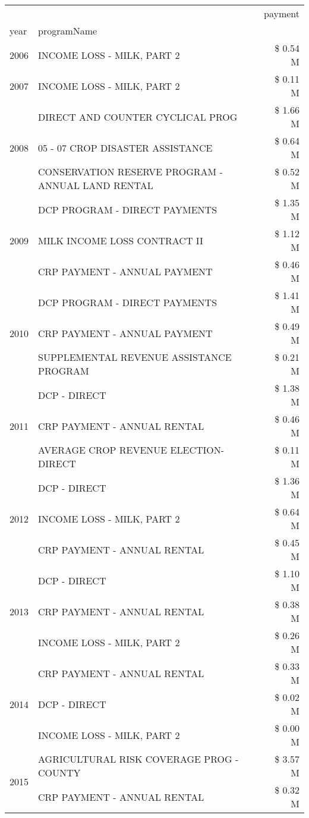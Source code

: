 \begin{tabular}{llr}
\toprule
 &  & payment \\
year & programName &  \\
\midrule
2006 & INCOME LOSS - MILK, PART 2 & \$ 0.54 M \\
\cline{1-3}
2007 & INCOME LOSS - MILK, PART 2 & \$ 0.11 M \\
\cline{1-3}
\multirow[t]{3}{*}{2008} & DIRECT AND COUNTER CYCLICAL PROG & \$ 1.66 M \\
 & 05 - 07 CROP DISASTER ASSISTANCE & \$ 0.64 M \\
 & CONSERVATION RESERVE PROGRAM - ANNUAL LAND RENTAL & \$ 0.52 M \\
\cline{1-3}
\multirow[t]{3}{*}{2009} & DCP PROGRAM - DIRECT PAYMENTS & \$ 1.35 M \\
 & MILK INCOME LOSS CONTRACT II & \$ 1.12 M \\
 & CRP PAYMENT - ANNUAL PAYMENT & \$ 0.46 M \\
\cline{1-3}
\multirow[t]{3}{*}{2010} & DCP PROGRAM - DIRECT PAYMENTS & \$ 1.41 M \\
 & CRP PAYMENT - ANNUAL PAYMENT & \$ 0.49 M \\
 & SUPPLEMENTAL REVENUE ASSISTANCE PROGRAM & \$ 0.21 M \\
\cline{1-3}
\multirow[t]{3}{*}{2011} & DCP - DIRECT & \$ 1.38 M \\
 & CRP PAYMENT - ANNUAL RENTAL & \$ 0.46 M \\
 & AVERAGE CROP REVENUE ELECTION-DIRECT & \$ 0.11 M \\
\cline{1-3}
\multirow[t]{3}{*}{2012} & DCP - DIRECT & \$ 1.36 M \\
 & INCOME LOSS - MILK, PART 2 & \$ 0.64 M \\
 & CRP PAYMENT - ANNUAL RENTAL & \$ 0.45 M \\
\cline{1-3}
\multirow[t]{3}{*}{2013} & DCP - DIRECT & \$ 1.10 M \\
 & CRP PAYMENT - ANNUAL RENTAL & \$ 0.38 M \\
 & INCOME LOSS - MILK, PART 2 & \$ 0.26 M \\
\cline{1-3}
\multirow[t]{3}{*}{2014} & CRP PAYMENT - ANNUAL RENTAL & \$ 0.33 M \\
 & DCP - DIRECT & \$ 0.02 M \\
 & INCOME LOSS - MILK, PART 2 & \$ 0.00 M \\
\cline{1-3}
\multirow[t]{3}{*}{2015} & AGRICULTURAL RISK COVERAGE PROG - COUNTY & \$ 3.57 M \\
 & CRP PAYMENT - ANNUAL RENTAL & \$ 0.32 M \\

\end{tabular}
